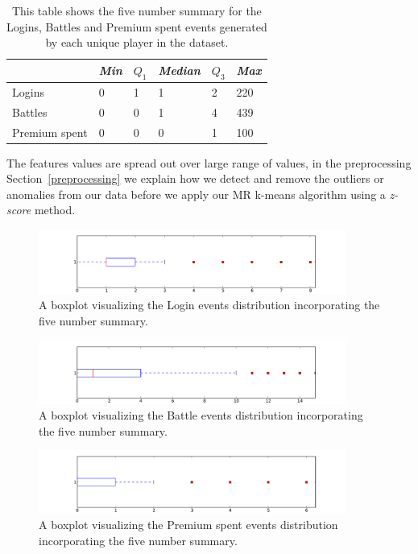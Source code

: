 \begin{table}[h]
\centering
\begin{tabular}{| l | l | l | l | l | l |}
    \hline
    & \textit{Min} & $Q_1$ & \textit{Median} & $Q_3$ & \textit{Max} \\ \hline
    Logins & 0 & 1 & 1 & 2 & 220 \\ \hline
    Battles & 0 & 0 & 1 & 4 & 439 \\ \hline
    Premium spent & 0 & 0 & 0 & 1 & 100 \\ \hline
\end{tabular}
\caption{This table shows the five number summary for the Logins, Battles and Premium spent events generated by each unique player in the dataset.}
\label{tab:FiveSummaryLoginsBattlesPremium}
\end{table}

The features values are spread out over large range of values, in the preprocessing Section~\ref{preprocessing} we explain how we detect and remove the outliers or anomalies from our data before we apply our MR k-means algorithm using a \textit{z-score} method.

\begin{center}
\begin{figure}[h]
\centerline{\includegraphics[width=0.9\textwidth]{Figures/boxplot_logins.pdf}}
\caption{A boxplot visualizing the Login events distribution incorporating the five number summary.}
\label{fig:boxplot_logins}
\end{figure}

\begin{figure}[h]
\centerline{\includegraphics[width=0.9\textwidth]{Figures/boxplot_battles.pdf}}
\caption{A boxplot visualizing the Battle events distribution incorporating the five number summary.}
\label{fig:boxplot_battles}
\end{figure}

\begin{figure}[here]
\centerline{\includegraphics[width=0.9\textwidth]{Figures/boxplot_premiumspent.pdf}}
\caption{A boxplot visualizing the Premium spent events distribution incorporating the five number summary.}
\label{fig:boxplot_premium}
\end{figure}
\end{center}


